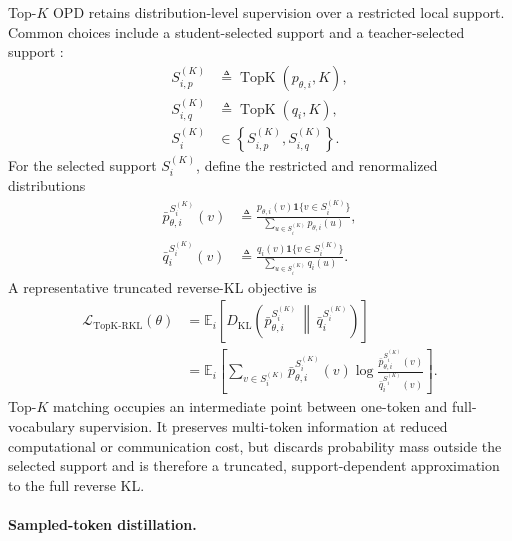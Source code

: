 Top-\(K\) OPD retains distribution-level supervision over a restricted local
support. Common choices include a student-selected support
\citep{li2026rethinkingopd,ye2026opcd} and a teacher-selected support
\citep{fu2026revisitingopd}:
\begin{equation*}
\begin{aligned}
 S_{i,p}^{(K)}
 &\triangleq
 \operatorname{TopK}(p_{\theta,i},K),\\
 S_{i,q}^{(K)}
 &\triangleq
 \operatorname{TopK}(q_i,K),\\
 S_i^{(K)}
 &\in
 \left\{S_{i,p}^{(K)},S_{i,q}^{(K)}\right\}.
\end{aligned}
\end{equation*}
For the selected support \(S_i^{(K)}\), define the restricted and
renormalized distributions
\begin{equation*}
\begin{aligned}
 \bar p_{\theta,i}^{S_i^{(K)}}(v)
 &\triangleq
 \frac{
 p_{\theta,i}(v)\mathbf 1\{v\in S_i^{(K)}\}
 }{
 \sum_{u\in S_i^{(K)}}p_{\theta,i}(u)
 },\\
 \bar q_i^{S_i^{(K)}}(v)
 &\triangleq
 \frac{
 q_i(v)\mathbf 1\{v\in S_i^{(K)}\}
 }{
 \sum_{u\in S_i^{(K)}}q_i(u)
 }.
\end{aligned}
\end{equation*}
A representative truncated reverse-KL objective is
\begin{equation*}
\begin{aligned}
 \mathcal L_{\mathrm{TopK\text{-}RKL}}(\theta)
 &=
 \mathbb E_i\!\left[
 D_{\mathrm{KL}}\!\left(
 \bar p_{\theta,i}^{S_i^{(K)}}
 \,\middle\|\,
 \bar q_i^{S_i^{(K)}}
 \right)
 \right]\\
 &=
 \mathbb E_i\!\left[
 \sum_{v\in S_i^{(K)}}
 \bar p_{\theta,i}^{S_i^{(K)}}(v)
 \log
 \frac{
 \bar p_{\theta,i}^{S_i^{(K)}}(v)
 }{
 \bar q_i^{S_i^{(K)}}(v)
 }
 \right].
\end{aligned}
\end{equation*}
Top-\(K\) matching occupies an intermediate point between one-token and
full-vocabulary supervision. It preserves multi-token information at reduced
computational or communication cost, but discards probability mass outside the
selected support and is therefore a truncated, support-dependent approximation
to the full reverse KL.

\paragraph{Sampled-token distillation.}

